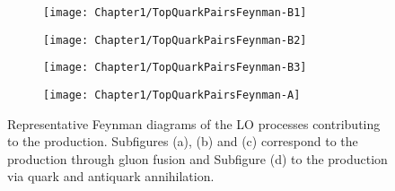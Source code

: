 \begin{figure}
\begin{subfigure}[h]{0.23\linewidth}
	\texttt{[image: Chapter1/TopQuarkPairsFeynman-B1]}
	\caption{}
	\label{fig:Chap1:top:topPairs:FeynmanB1}
\end{subfigure}
\hfill
\begin{subfigure}[h]{0.23\linewidth}
	\texttt{[image: Chapter1/TopQuarkPairsFeynman-B2]}
	\caption{}
	\label{fig:Chap1:top:topPairs:FeynmanB2}
\end{subfigure}
\hfill
\begin{subfigure}[h]{0.23\linewidth}
	\texttt{[image: Chapter1/TopQuarkPairsFeynman-B3]}
	\caption{}
	\label{fig:Chap1:top:topPairs:FeynmanB3}
\end{subfigure}
\hfill
\begin{subfigure}[h]{0.25\linewidth}
	\texttt{[image: Chapter1/TopQuarkPairsFeynman-A]}
	\caption{}
	\label{fig:Chap1:top:topPairs:FeynmanA}
\end{subfigure}%
\caption{Representative Feynman diagrams of the LO processes contributing to the \ttbar 
production. Subfigures (a), (b) and (c) correspond to the production through gluon fusion 
and Subfigure (d) to the production via quark and antiquark annihilation.}
\label{fig:Chap1:top:topPairs:Feynman}
\end{figure}






